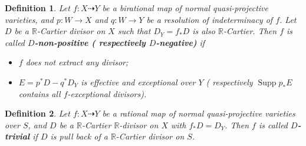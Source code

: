 \documentclass{article}
\newtheorem{defn}{Definition}[subsection]
\begin{document}
\begin{defn}\label{negativemap}
  \cite[Definition 3.6.1]{birkarExistenceMinimalModels2009}Let $f:X\dashrightarrow Y$ be a birational map of normal quasi-projective varieties, and $p:W\to X$ and $q:W\to Y$ be a resolution of indeterminacy of $f$. Let $D$ be a $\mathbb{R}$-Cartier divisor on $X$ such that  $D_{Y}=f_*D$ is  also $\mathbb{R}$-Cartier. Then $f$ is called \textbf{$D$-non-positive ( respectively $D$-negative)} if
\begin{itemize}
  \item $f$ does not extract any divisor;
  \item $E=p^{*}D-q^*D_Y$ is effective and exceptional over $Y$ ( respectively $\operatorname{Supp}p_*E$ contains all $f$-exceptional divisors).
\end{itemize}
\end{defn}
\begin{defn}\label{trivialmap}
  \cite[13.2.Notation and conventions]{haconMinimalModelProgram2012} Let $f:X\dashrightarrow Y$ be a rational map of normal quasi-projective varieties over $S$, and $D$ be a $\mathbb{R}$-Cartier $\mathbb{R}$-divisor  on $X$ with $f_*D=D_Y$. Then $f$ is called \textbf{$D$-trivial} if $D$ is pull back of a $\mathbb{R}$-Cartier divisor on $S$.
\end{defn}
\end{document}
